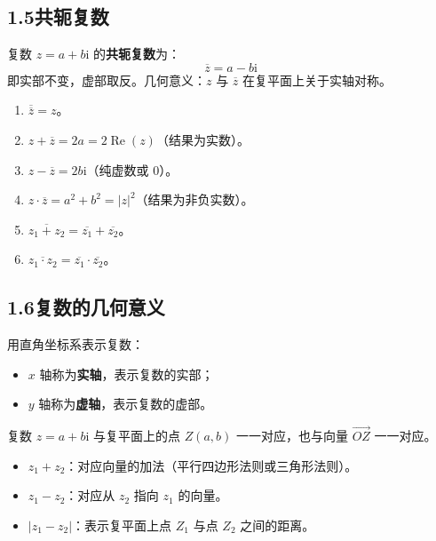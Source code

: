 \documentclass[12pt, a4paper]{ctexart}
\begin{document}
\subsection*{1.5\quad 共轭复数}

\begin{knowledgebox}[共轭复数的定义]
复数 $z = a + b\mathrm{i}$ 的\textbf{共轭复数}为：
\[
  \overline{z} = a - b\mathrm{i}
\]
即实部不变，虚部取反。几何意义：$z$ 与 $\overline{z}$ 在复平面上关于实轴对称。
\end{knowledgebox}

\begin{tipbox}[共轭复数的性质]
\begin{enumerate}[leftmargin=2em]
  \item $\overline{\overline{z}} = z$。
  \item $z + \overline{z} = 2a = 2\operatorname{Re}(z)$（结果为实数）。
  \item $z - \overline{z} = 2b\mathrm{i}$（纯虚数或 $0$）。
  \item $z \cdot \overline{z} = a^2 + b^2 = |z|^2$（结果为非负实数）。
  \item $\overline{z_1 + z_2} = \overline{z_1} + \overline{z_2}$。
  \item $\overline{z_1 \cdot z_2} = \overline{z_1} \cdot \overline{z_2}$。
\end{enumerate}
\end{tipbox}

\subsection*{1.6\quad 复数的几何意义}

\begin{knowledgebox}[复平面]
用直角坐标系表示复数：
\begin{itemize}[leftmargin=2em]
  \item $x$ 轴称为\textbf{实轴}，表示复数的实部；
  \item $y$ 轴称为\textbf{虚轴}，表示复数的虚部。
\end{itemize}
复数 $z = a + b\mathrm{i}$ 与复平面上的点 $Z(a, b)$ 一一对应，也与向量 $\overrightarrow{OZ}$ 一一对应。
\end{knowledgebox}

\begin{knowledgebox}[复数加减法的几何意义]
\begin{itemize}[leftmargin=2em]
  \item $z_1 + z_2$：对应向量的加法（平行四边形法则或三角形法则）。
  \item $z_1 - z_2$：对应从 $z_2$ 指向 $z_1$ 的向量。
  \item $|z_1 - z_2|$：表示复平面上点 $Z_1$ 与点 $Z_2$ 之间的距离。
\end{itemize}
\end{knowledgebox}
\end{document}
